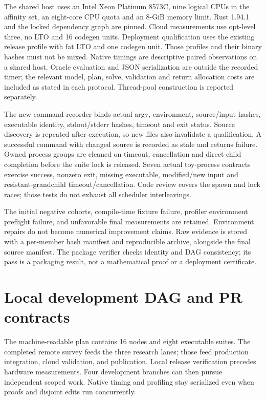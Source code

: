 \documentclass[aps,pra,reprint,onecolumn,12pt,notitlepage,superscriptaddress,nofootinbib]{revtex4-2}
\begin{document}
The shared host uses an Intel Xeon Platinum 8573C, nine logical CPUs in
the affinity set, an eight-core CPU quota and an 8-GiB memory limit.
Rust 1.94.1 and the locked dependency graph are pinned. Cloud measurements
use opt-level three, no LTO and 16 codegen units. Deployment qualification
uses the existing release profile with fat LTO and one codegen unit.
Those profiles and their binary hashes must not be mixed. Native timings
are descriptive paired observations on a shared host. Oracle evaluation and
JSON serialization are outside the recorded timer; the relevant model,
plan, solve, validation and return allocation costs are included as stated
in each protocol. Thread-pool construction is reported separately.

The new command recorder binds actual argv, environment, source/input hashes,
executable identity, stdout/stderr hashes, timeout and exit status. Source
discovery is repeated after execution, so new files also invalidate a
qualification. A successful command with changed source is recorded as
stale and returns failure. Owned process groups are cleaned on timeout,
cancellation and direct-child completion before the suite lock is released.
Seven actual toy-process contracts exercise success, nonzero exit, missing
executable, modified/new input and resistant-grandchild timeout/cancellation.
Code review covers the spawn and lock races; those tests do not exhaust all
scheduler interleavings.

The initial negative cohorts, compile-time fixture failure, profiler
environment preflight failure, and unfavorable final measurements are
retained. Environment repairs do not become numerical improvement claims.
Raw evidence is stored with a per-member hash manifest and reproducible
archive, alongside the final source manifest. The package verifier checks
identity and DAG consistency; its pass is a packaging result, not a
mathematical proof or a deployment certificate.

\section{Local development DAG and PR contracts}
The machine-readable plan contains 16 nodes and eight executable suites.
The completed remote survey feeds the three research lanes; those feed
production integration, cloud validation, and publication. Local release
verification precedes hardware measurements. Four development branches can
then pursue independent scoped work. Native timing and profiling stay
serialized even when proofs and disjoint edits run concurrently.
\end{document}
